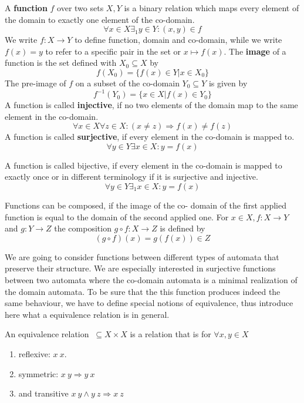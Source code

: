            
            \begin{definition}[Function]\label{fun}
            A \textbf{function} $f$ over two sets $X, Y$ is a binary relation which maps every element of the domain to exactly one element of the co-domain.
            \[ \forall x \in X \exists_1 y \in Y : (x,y) \in f \]
            We write $f: X \rightarrow Y$ to define function, domain and co-domain, while we write $f(x) = y$ to refer to a specific pair in the set or $x \mapsto f(x)$. 
            The \textbf{image} of a function is the set defined with $X_0 \subseteq X$ by
            \[ f(X_0) = \{ f(x) \in Y | x \in X_0 \} \]
            The pre-image of $f$ on a subset of the co-domain $Y_0 \subseteq Y$ is given by
            \[ f^{-1}(Y_0) = \{ x \in X | f(x) \in Y_0 \} \]
            A function is called \textbf{injective}, if no two elements of the domain map to the same element in the co-domain.
            \[ \forall x \in X \forall z \in X: (x \neq z) \Rightarrow f(x) \neq f(z) \]
            A function is called \textbf{surjective}, if every element in the co-domain is mapped to.
                \[ \forall y \in Y \exists x \in X: y = f(x) \]
                
            A function is called bijective, if every element in the co-domain is mapped to exactly once or in different terminology if it is surjective and injective.
            \[ \forall y \in Y  \exists_1 x \in X: y = f(x) \]
            
            Functions can be composed, if the image of the co- domain of the first applied function is equal to the domain of the second applied one. For $x \in X, f: X \rightarrow Y$ and $g: Y \rightarrow Z$ the composition $g \circ f: X \rightarrow Z$ is defined by
            \[ (g \circ f)(x) = g(f(x)) \in Z  \]
            \end{definition}
            
             We are going to consider functions between different types of automata that preserve their structure. We are especially interested in surjective functions between two automata where the co-domain automata is a minimal realization of the domain automata. To be sure that the this function produces indeed the same behaviour, we have to define special notions of equivalence, thus introduce here what a equivalence relation is in general.
            
            \begin{definition}\label{eqrel}
            An equivalence relation $~\subseteq X \times X$ is a relation that is for $\forall x, y \in X$
            \begin{enumerate}
             \item reflexive: $ x ~ x$.
             \item symmetric: $x ~ y \Rightarrow y ~ x$
             \item and transitive $x ~ y \wedge y ~ z \Rightarrow x ~ z$
            \end{enumerate} 
            \end{definition}
            
